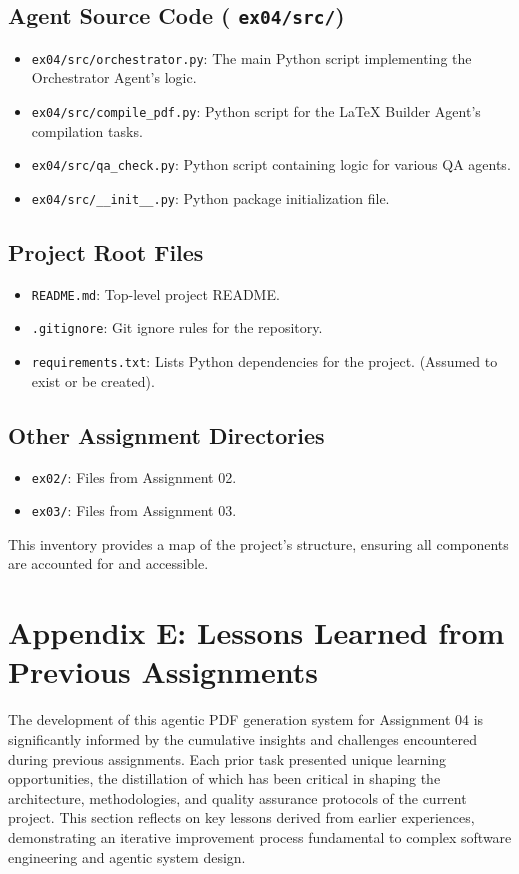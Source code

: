 \documentclass{custom-academic-template}
\begin{document}
\subsection{Agent Source Code (	\texttt{ex04/src/})}
\begin{itemize}
    \item 	\texttt{ex04/src/orchestrator.py}: The main Python script implementing the Orchestrator Agent's logic.
    \item 	\texttt{ex04/src/compile\_pdf.py}: Python script for the LaTeX Builder Agent's compilation tasks.
    \item 	\texttt{ex04/src/qa\_check.py}: Python script containing logic for various QA agents.
    \item 	\texttt{ex04/src/\_\_init\_\_.py}: Python package initialization file.
\end{itemize}

\subsection{Project Root Files}
\begin{itemize}
    \item 	\texttt{README.md}: Top-level project README.
    \item 	\texttt{.gitignore}: Git ignore rules for the repository.
    \item 	\texttt{requirements.txt}: Lists Python dependencies for the project. (Assumed to exist or be created).
\end{itemize}

\subsection{Other Assignment Directories}
\begin{itemize}
    \item 	\texttt{ex02/}: Files from Assignment 02.
    \item 	\texttt{ex03/}: Files from Assignment 03.
\end{itemize}
This inventory provides a map of the project's structure, ensuring all components are accounted for and accessible.


\section{Appendix E: Lessons Learned from Previous Assignments}
The development of this agentic PDF generation system for Assignment 04 is significantly informed by the cumulative insights and challenges encountered during previous assignments. Each prior task presented unique learning opportunities, the distillation of which has been critical in shaping the architecture, methodologies, and quality assurance protocols of the current project. This section reflects on key lessons derived from earlier experiences, demonstrating an iterative improvement process fundamental to complex software engineering and agentic system design.
\end{document}
